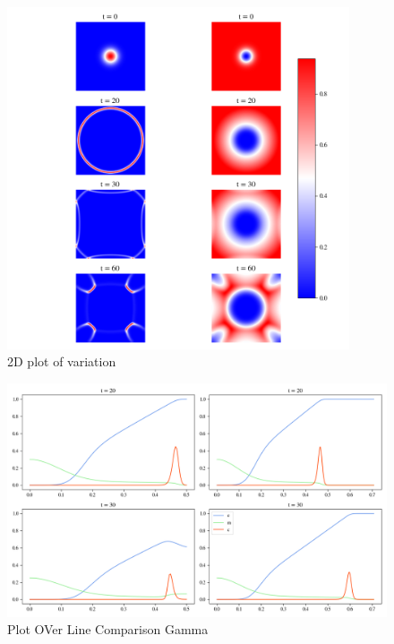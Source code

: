 \begin{figure}[h]
    \centering
    \includegraphics[width=0.9\textwidth]{resources/images/2D_plot.png}
    \caption{2D plot of variation}
    \label{fig:gamma_2D_plot}
\end{figure}
\begin{figure}[h]
    \centering
    \includegraphics[width=\textwidth]{resources/images/pol_comparison.png}
    \caption{Plot OVer Line Comparison Gamma}
    \label{fig:gamma_pol_comparison}
\end{figure}
